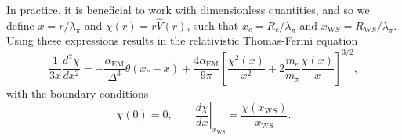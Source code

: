 In practice, it is beneficial to work with dimensionless quantities, and so we define $x = r/\lambda_\pi$ and $\chi(r) = r\hat{V}(r)$, such that $x_c = R_c/\lambda_\pi$ and $x_{\mathrm WS} = R_{\mathrm WS}/\lambda_\pi$.
Using these expressions results in the relativistic Thomas-Fermi equation
\begin{equation}
    \frac{1}{3x}\frac{d^2\chi}{dx^2} = -\frac{\alpha_{\mathrm{EM}}}{\Delta^3}\theta(x_c -x) + \frac{4\alpha_\mathrm{EM}}{9\pi}\left[ \frac{\chi^2(x)}{x^2} + 2\frac{m_e}{m_\pi}\frac{\chi(x)}{x}\right]^{3/2},\label{ch2:eq:FMT_DE}
\end{equation}
with the boundary conditions
\begin{equation}
    \chi(0) = 0, \qquad
    \left. \frac{d\chi}{dx}\right|_{x_{\mathrm{WS}}} = \frac{\chi(x_{\mathrm WS})}{x_{\mathrm{WS}}}. \label{ch2:eq:TF_bc}
\end{equation}


